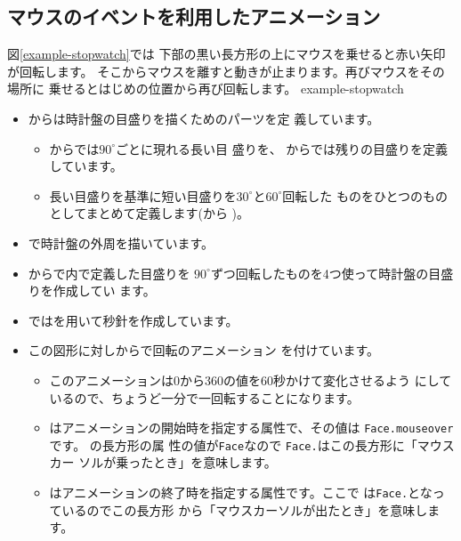 \subsection{マウスのイベントを利用したアニメーション}
図\ref{example-stopwatch}では
下部の黒い長方形の上にマウスを乗せると赤い矢印が回転します。
そこからマウスを離すと動きが止まります。再びマウスをその場所に
乗せるとはじめの位置から再び回転します。
{example-stopwatch}

\begin{itemize}
 \item {}からは時計盤の目盛りを描くためのパーツを定
       義しています。
\begin{itemize}
 \item {}からでは$90^{\circ}$ごとに現れる長い目
       盛りを、%
      からでは残りの目盛りを定義しています。
 \item 長い目盛りを基準に短い目盛りを$30^{\circ}$と$60^{\circ}$回転した
       ものをひとつのものとしてまとめて定義します(から
       )。
\end{itemize}
 \item {}で時計盤の外周を描いています。
 \item {}からで内で定義した目盛りを
       $90^{\circ}$ずつ回転したものを4つ使って時計盤の目盛りを作成してい
       ます。
 \item {}ではを用いて秒針を作成しています。
 \item この図形に対しからで回転のアニメーション
       を付けています。
\begin{itemize}
 \item このアニメーションは$0$から$360$の値を$60$秒かけて変化させるよう
       にしているので、ちょうど一分で一回転することになります。
 \item {}はアニメーションの開始時を指定する属性で、その値は
       \texttt{Face.mouseover}です。
%
       の長方形の属
       性の値が\texttt{Face}なので
       \texttt{Face.}はこの長方形に「マウスカー
       ソルが乗ったとき」を意味します。
 \item {}はアニメーションの終了時を指定する属性です。ここで
       は\texttt{Face.}となっているのでこの長方形
       から「マウスカーソルが出たとき」を意味します。
\end{itemize}
\end{itemize}
